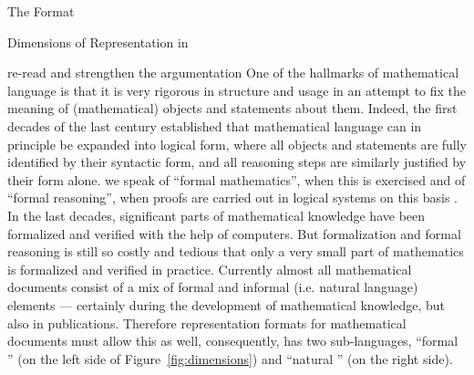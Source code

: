 \begin{omgroup}[creators=miko,id=spec-intro]{The \omdoc Format}
\begin{omgroup}[id=syntax-semantics]{Dimensions of Representation in \omdoc}
\begin{newpart}{re-read and strengthen the argumentation}
One of the hallmarks of mathematical language is that it is very rigorous in structure and
usage in an attempt to fix the meaning of (mathematical) objects and statements about
them. Indeed, the first decades of the last century established that mathematical language
can in principle be expanded into logical form, where all objects and statements are fully
identified by their syntactic form, and all reasoning steps are similarly justified by
their form alone. we speak of ``formal mathematics'', when this is exercised and of
``formal reasoning'', when proofs are carried out in logical systems on this basis . In
the last decades, significant parts of mathematical knowledge have been formalized and
verified with the help of computers. But formalization and formal reasoning is still so
costly and tedious that only a very small part of mathematics is formalized and verified
in practice. Currently almost all mathematical documents consist of a mix of formal and
informal (i.e. natural language) elements --- certainly during the development of
mathematical knowledge, but also in publications. Therefore representation formats for
mathematical documents must allow this as well, consequently, \omdoc has two
sub-languages, ``formal \omdoc'' (on the left side of Figure~\ref{fig:dimensions}) and
``natural \omdoc'' (on the right side).


\end{newpart}
\end{omgroup}
\end{omgroup}
